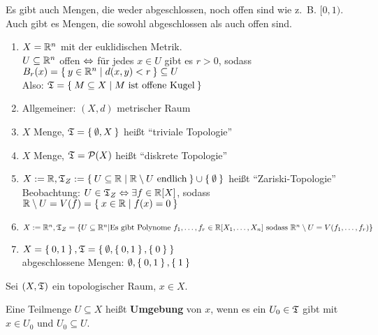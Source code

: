 Es gibt auch Mengen, die weder abgeschlossen, noch offen sind wie z.~B. $[0,1)$.
Auch gibt es Mengen, die sowohl abgeschlossen als auch offen sind.

\begin{beispiel}
    \begin{enumerate}[1)]
        \item $X = \mathbb{R}^n$ mit der euklidischen Metrik.\\ 
              $U \subseteq \mathbb{R}^n$ offen $\Leftrightarrow$ für jedes $x \in U$ 
              gibt es $r > 0$, sodass $B_r(x) = \Set{y \in \ensuremath{\mathbb{R}}^n | d(x,y) < r} \subseteq U$\\
              Also: $\mathfrak{T} = \Set{M \subseteq X | M \text{ ist offene Kugel}}$
        \item Allgemeiner: $(X, d)$ metrischer Raum
        \item $X$ Menge, $\mathfrak{T} = \Set{\emptyset, X}$ heißt \enquote{triviale Topologie} 
        \item $X$ Menge, $\mathfrak{T} = \mathcal{P}(X)$ heißt \enquote{diskrete Topologie} 
        \item $X :=\mathbb{R}, \mathfrak{T}_Z := \Set{U \subseteq \ensuremath{\mathbb{R}}| \ensuremath{\mathbb{R}}\setminus U \text{ endlich}} \cup \Set{\emptyset}$ heißt \enquote{Zariski-Topologie} \\
              Beobachtung: $U \in \mathfrak{T}_Z \Leftrightarrow \exists f \in \mathbb{R}[X]$, sodass $\mathbb{R} \setminus U = V(f) = \Set{x \in \ensuremath{\mathbb{R}}| f(x) = 0}$
        \item $X := \mathbb{R}^n, \mathfrak{T}_Z = \{U \subseteq \mathbb{R}^n | \text{Es gibt Polynome } f_1, \dots, f_r \in \mathbb{R}[X_1, \dots, X_n] \text{ sodass }\\\mathbb{R}^n \setminus U = V(f_1, \dots, f_r)\}$
        \item $X = \Set{0,1}, \mathfrak{T} = \Set{\emptyset, \Set{0,1}, \Set{0}}$\\
              abgeschlossene Mengen: $\emptyset, \Set{0,1}, \Set{1}$
    \end{enumerate}
\end{beispiel}

\begin{definition} 
    Sei $(X, \mathfrak{T})$ ein topologischer Raum, $x \in X$.

    Eine Teilmenge $U \subseteq X$ heißt \textbf{Umgebung} von $x$,
    wenn es ein $U_0 \in \mathfrak{T}$ gibt mit $x \in U_0$ und $U_0 \subseteq U$.
\end{definition}

